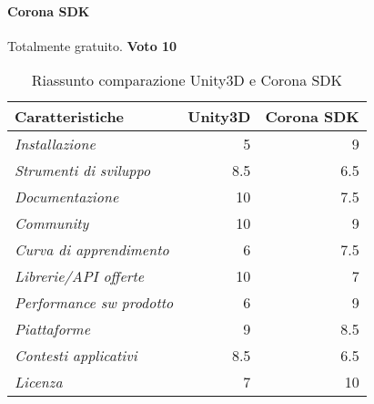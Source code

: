 		\paragraph{Corona SDK} Totalmente gratuito. \textbf{Voto 10}
		
		
	\begin{table}
		\centering
		\begin{tabular}{lrr}
			\toprule
			\textbf{Caratteristiche} & \textbf{Unity3D} & \textbf{Corona SDK} \\
			\toprule
			\emph{Installazione} & 5 & 9 \\
			
			\emph{Strumenti di sviluppo} & 8.5 & 6.5 \\
			
			\emph{Documentazione} & 10 & 7.5 \\
			
			\emph{Community} & 10 & 9 \\
			
			\emph{Curva di apprendimento} & 6 & 7.5 \\
			
			\emph{Librerie/API offerte} & 10 & 7 \\
			
			\emph{Performance sw prodotto} & 6 & 9 \\
			
			\emph{Piattaforme} & 9 & 8.5 \\
			
			\emph{Contesti applicativi} & 8.5 & 6.5 \\
			
			\emph{Licenza} & 7 & 10 \\
			
			\bottomrule
		\end{tabular}
		\caption{Riassunto comparazione Unity3D e Corona SDK}
	\end{table}
	
	

